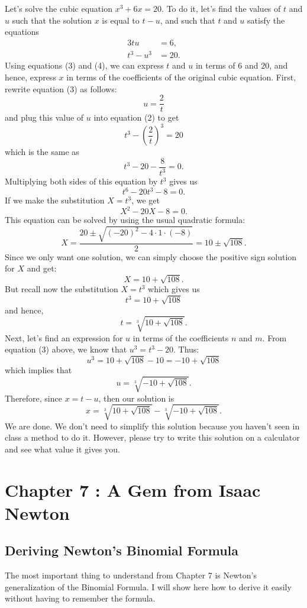 \documentclass{article}
\theoremstyle{plain}
\theoremstyle{definition}
\begin{document}
Let's solve the cubic equation $x^3 + 6x = 20$. To do it, let's find the values of $t$ and $u$ such that the solution $x$ is equal to $t - u$, and such that $t$ and $u$ satisfy the equations
\begin{align}
    3tu &= 6, \\
    t^3 - u^3 &= 20.
\end{align}
Using equations (3) and (4), we can express $t$ and $u$ in terms of $6$ and $20$, and hence, express $x$ in terms of the coefficients of the original cubic equation. First, rewrite equation (3) as follows:
$$u = \frac{2}{t}$$
and plug this value of $u$ into equation (2) to get
$$t^3 - \left(\frac{2}{t}\right)^3 = 20$$
which is the same as
$$t^3 - 20 - \frac{8}{t^3} = 0.$$
Multiplying both sides of this equation by $t^3$ gives us
$$t^6 - 20t^3 - 8 = 0.$$
If we make the substitution $X = t^3$, we get
$$X^2 - 20X - 8 = 0.$$
This equation can be solved by using the usual quadratic formula:
$$X = \frac{20 \pm \sqrt{(-20)^2 - 4\cdot 1 \cdot (-8)}}{2} = 10 \pm \sqrt{108}.$$
Since we only want one solution, we can simply choose the positive sign solution for $X$ and get:
$$X =10 + \sqrt{108}.$$
But recall now the substitution $X = t^3$ which gives us
$$t^3 = 10 + \sqrt{108}$$
and hence,
$$t = \sqrt[3]{10 + \sqrt{108}}.$$
Next, let's find an expression for $u$ in terms of the coefficients $n$ and $m$. From equation (3) above, we know that $u^3 = t^3 - 20$. Thus:
$$u^3 =  10 + \sqrt{108} - 10 =  -10 + \sqrt{108}$$
which implies that
$$u = \sqrt[3]{-10 + \sqrt{108}}.$$
Therefore, since $x = t-u$, then our solution is 
$$x = \sqrt[3]{10 + \sqrt{108}} - \sqrt[3]{-10 + \sqrt{108}}.$$
We are done. We don't need to simplify this solution because you haven't seen in class a method to do it. However, please try to write this solution on a calculator and see what value it gives you.

\section*{Chapter 7 : A Gem from Isaac Newton}

\subsection*{Deriving Newton's Binomial Formula}

The most important thing to understand from Chapter 7 is Newton's generalization of the Binomial Formula. I will show here how to derive it easily without having to remember the formula.
\end{document}
